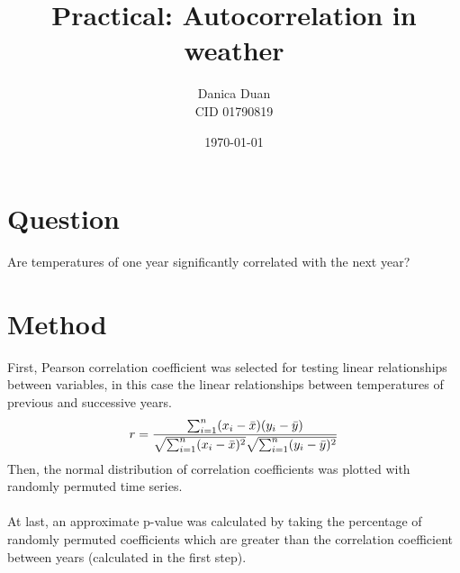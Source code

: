\documentclass{article}
\title{Practical: Autocorrelation in weather}
\author{Danica Duan \\ CID 01790819}
\date{\today}
\begin{document}
\maketitle

\section*{Question}
Are temperatures of one year significantly correlated with the next year?

\section*{Method}
First, Pearson correlation coefficient\cite{freedman2007statistics} was selected for testing linear relationships between variables, in this case the linear relationships between temperatures of previous and successive years. 
\begin{align}
    \label{Pearson correlation} %
    r = 
    \frac{ \sum_{i=1}^{n}(x_i-\bar{x})(y_i-\bar{y}) }{%
        \sqrt{\sum_{i=1}^{n}(x_i-\bar{x})^2}\sqrt{\sum_{i=1}^{n}(y_i-\bar{y})^2}}
\end{align}
Then, the normal distribution of correlation coefficients was plotted with randomly permuted time series.
\\
\\At last, an approximate p-value was calculated by taking the percentage of randomly permuted coefficients which are greater than the correlation coefficient between years (calculated in the first step). 
\end{document}
